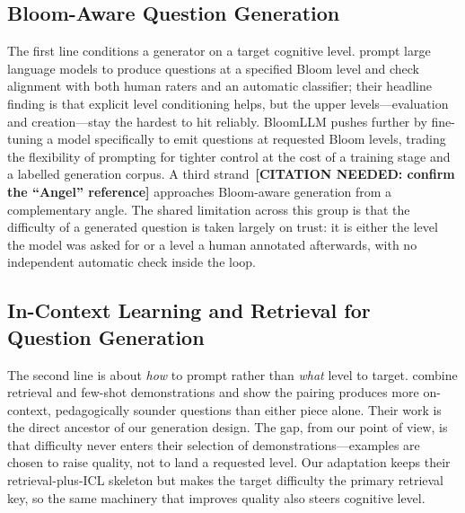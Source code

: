 \documentclass[12pt,a4paper]{report}
\begin{document}
\subsection{Bloom-Aware Question Generation}
The first line conditions a generator on a target cognitive level.
\textcite{scaria2024aeqg} prompt large language models to produce questions at a
specified Bloom level and check alignment with both human raters and an automatic
classifier; their headline finding is that explicit level conditioning helps, but
the upper levels---evaluation and creation---stay the hardest to hit reliably.
BloomLLM \parencite{duongtrung2024bloomllm} pushes further by fine-tuning a model
specifically to emit questions at requested Bloom levels, trading the flexibility
of prompting for tighter control at the cost of a training stage and a labelled
generation corpus. A third strand
\parencite{angelPLACEHOLDER}\,\textbf{[CITATION NEEDED: confirm the ``Angel''
reference]} approaches Bloom-aware generation from a complementary angle. The
shared limitation across this group is that the difficulty of a generated
question is taken largely on trust: it is either the level the model was asked
for or a level a human annotated afterwards, with no independent automatic check
inside the loop.

\subsection{In-Context Learning and Retrieval for Question Generation}
The second line is about \emph{how} to prompt rather than \emph{what} level to
target. \textcite{maity2025icl} combine retrieval and few-shot demonstrations and
show the pairing produces more on-context, pedagogically sounder questions than
either piece alone. Their work is the direct ancestor of our generation design.
The gap, from our point of view, is that difficulty never enters their selection
of demonstrations---examples are chosen to raise quality, not to land a requested
level. Our adaptation keeps their retrieval-plus-ICL skeleton but makes the
target difficulty the primary retrieval key, so the same machinery that improves
quality also steers cognitive level.
\end{document}
